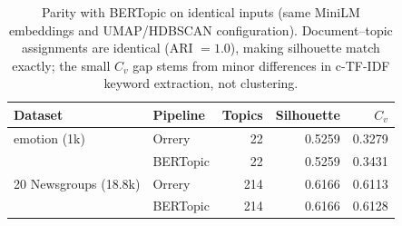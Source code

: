 \begin{table}[t]
\centering
\small
\begin{tabular}{llrrr}
\toprule
Dataset & Pipeline & Topics & Silhouette & $C_v$ \\
\midrule
emotion (1k) & Orrery & 22 & 0.5259 & 0.3279 \\
 & BERTopic & 22 & 0.5259 & 0.3431 \\
\midrule
20 Newsgroups (18.8k) & Orrery & 214 & 0.6166 & 0.6113 \\
 & BERTopic & 214 & 0.6166 & 0.6128 \\
\bottomrule
\end{tabular}
\caption{Parity with BERTopic on identical inputs (same MiniLM embeddings and
UMAP/HDBSCAN configuration). Document--topic assignments are identical
(ARI $=1.0$), making silhouette match exactly; the small $C_v$ gap stems from
minor differences in c-TF-IDF keyword extraction, not clustering.}
\label{tab:bertopic-parity}
\end{table}
